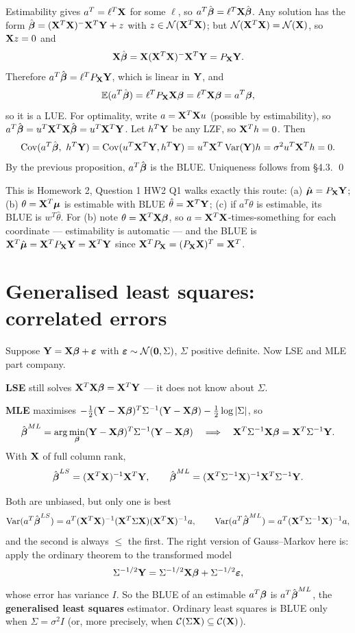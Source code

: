 \documentclass[11pt]{article}
\begin{document}
\prf Estimability gives $a^T=\ell^T\mathbf{X}$ for some $\ell$, so $a^T\hat{\boldsymbol{\beta}}=\ell^T\mathbf{X}\hat{\boldsymbol{\beta}}$.
Any solution has the form $\hat{\boldsymbol{\beta}}=(\mathbf{X}^T\mathbf{X})^-\mathbf{X}^T\mathbf{Y}+z$ with $z\in\mathcal{N}(\mathbf{X}^T\mathbf{X})$;
but $\mathcal{N}(\mathbf{X}^T\mathbf{X})=\mathcal{N}(\mathbf{X})$, so $\mathbf{X} z=0$ and
\[
  \mathbf{X}\hat{\boldsymbol{\beta}}=\mathbf{X}(\mathbf{X}^T\mathbf{X})^-\mathbf{X}^T\mathbf{Y} = P_{\mathbf{X}}\mathbf{Y} .
\]
Therefore $a^T\hat{\boldsymbol{\beta}}=\ell^TP_{\mathbf{X}}\mathbf{Y}$, which is linear in $\mathbf{Y}$, and
\[
  \mathbb{E}(a^T\hat{\boldsymbol{\beta}})=\ell^TP_{\mathbf{X}}\mathbf{X}\boldsymbol{\beta}=\ell^T\mathbf{X}\boldsymbol{\beta}=a^T\boldsymbol{\beta},
\]
so it is a LUE. For optimality, write $a=\mathbf{X}^T\mathbf{X} u$ (possible by estimability), so
$a^T\hat{\boldsymbol{\beta}}=u^T\mathbf{X}^T\mathbf{X}\hat{\boldsymbol{\beta}}=u^T\mathbf{X}^T\mathbf{Y}$. Let $h^T\mathbf{Y}$ be any LZF, so $\mathbf{X}^Th=0$. Then
\[
  \Cov(a^T\hat\bb,\ h^T\bY)=\Cov(u^T\bX^T\bY,h^T\bY)
  =u^T\bX^T\Var(\bY)h=\sigma^2u^T\bX^Th=0 .
\]
By the previous proposition, $a^T\hat{\boldsymbol{\beta}}$ is the BLUE. Uniqueness follows from \S4.3. \qed

\begin{exam}{This is Homework 2, Question 1}
HW2 Q1 walks exactly this route: (a) $\hat{\boldsymbol{\mu}}=P_{\mathbf{X}}\mathbf{Y}$; (b) $\theta=\mathbf{X}^T\boldsymbol{\mu}$ is
estimable with BLUE $\hat\theta=\mathbf{X}^T\mathbf{Y}$; (c) if $a^T\theta$ is estimable, its BLUE is
$w^T\hat\theta$. For (b) note $\theta=\mathbf{X}^T\mathbf{X}\boldsymbol{\beta}$, so $a=\mathbf{X}^T\mathbf{X}$-times-something for each
coordinate --- estimability is automatic --- and the BLUE is
$\mathbf{X}^T\hat{\boldsymbol{\mu}}=\mathbf{X}^TP_{\mathbf{X}}\mathbf{Y}=\mathbf{X}^T\mathbf{Y}$ since $\mathbf{X}^TP_{\mathbf{X}}=(P_{\mathbf{X}}\mathbf{X})^T=\mathbf{X}^T$.
\end{exam}

\section{Generalised least squares: correlated errors}

Suppose $\mathbf{Y}=\mathbf{X}\boldsymbol{\beta}+\boldsymbol{\varepsilon}$ with $\boldsymbol{\varepsilon}\sim\mathcal{N}(\mathbf{0},\Sigma)$, $\Sigma$ positive definite. Now
LSE and MLE part company.

\textbf{LSE} still solves $\mathbf{X}^T\mathbf{X}\boldsymbol{\beta}=\mathbf{X}^T\mathbf{Y}$ --- it does not know about $\Sigma$.

\textbf{MLE} maximises $-\tfrac12(\mathbf{Y}-\mathbf{X}\boldsymbol{\beta})^T\Sigma^{-1}(\mathbf{Y}-\mathbf{X}\boldsymbol{\beta})-\tfrac12\log|\Sigma|$, so
\[
  \hat{\boldsymbol{\beta}}^{ML}=\arg\min_{\boldsymbol{\beta}} (\mathbf{Y}-\mathbf{X}\boldsymbol{\beta})^T\Sigma^{-1}(\mathbf{Y}-\mathbf{X}\boldsymbol{\beta})
  \quad\Longrightarrow\quad
  \mathbf{X}^T\Sigma^{-1}\mathbf{X}\boldsymbol{\beta}=\mathbf{X}^T\Sigma^{-1}\mathbf{Y} .
\]
With $\mathbf{X}$ of full column rank,
\[
  \hat{\boldsymbol{\beta}}^{LS}=(\mathbf{X}^T\mathbf{X})^{-1}\mathbf{X}^T\mathbf{Y},\qquad
  \hat{\boldsymbol{\beta}}^{ML}=(\mathbf{X}^T\Sigma^{-1}\mathbf{X})^{-1}\mathbf{X}^T\Sigma^{-1}\mathbf{Y} .
\]

\begin{idea}{Both are unbiased, but only one is best}
\[
  \operatorname{Var}(a^T\hat{\boldsymbol{\beta}}^{LS})=a^T(\mathbf{X}^T\mathbf{X})^{-1}(\mathbf{X}^T\Sigma\mathbf{X})(\mathbf{X}^T\mathbf{X})^{-1}a,
  \qquad
  \operatorname{Var}(a^T\hat{\boldsymbol{\beta}}^{ML})=a^T(\mathbf{X}^T\Sigma^{-1}\mathbf{X})^{-1}a,
\]
and the second is always $\le$ the first. The right version of Gauss--Markov here is: apply
the ordinary theorem to the transformed model
\[
  \Sigma^{-1/2}\mathbf{Y}=\Sigma^{-1/2}\mathbf{X}\boldsymbol{\beta}+\Sigma^{-1/2}\boldsymbol{\varepsilon},
\]
whose error has variance $I$. So the BLUE of an estimable $a^T\boldsymbol{\beta}$ is $a^T\hat{\boldsymbol{\beta}}^{ML}$,
the \textbf{generalised least squares} estimator. Ordinary least squares is BLUE only when
$\Sigma=\sigma^2 I$ (or, more precisely, when $\mathcal{C}(\Sigma\mathbf{X})\subseteq\mathcal{C}(\mathbf{X})$).
\end{idea}
\end{document}
